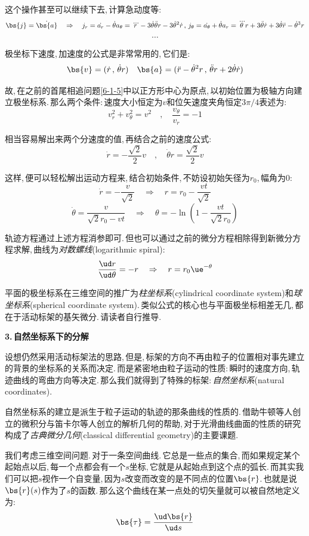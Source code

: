 这个操作甚至可以继续下去,\,计算急动度等:
\[\bs{j}=\dot{\bs{a}}\quad \Rightarrow \quad j_r=\dot{a_r}-\dot{\theta}a_\theta=\dddot{r}-3\dot{\theta}\ddot{\theta}r-3\dot{\theta}^2\dot{r}\,,\,j_\theta=\dot{a_\theta}+\dot{\theta}a_r=\dddot{\theta}r+3\ddot{\theta}\dot{r}+3\dot{\theta}\ddot{r}-\dot{\theta}^3r\]
\[\cdots\]

极坐标下速度,\,加速度的公式是非常常用的,\,它们是:
\[\bs{v}=(\dot{r}\,,\,\dot{\theta}r)\quad\bs{a}=(\ddot{r}-\dot{\theta}^2r\,,\,\ddot{\theta}r+2\dot{\theta}\dot{r})\]

故,\,在之前的首尾相追问题\ref{6-1-5}中以正方形中心为原点,\,以初始位置为极轴方向建立极坐标系.\,那么两个条件:\,速度大小恒定为$v$和位矢速度夹角恒定$3\pi/4$表述为:
\[v_r^2+v_\theta^2=v^2\quad ,\quad \frac{v_\theta}{v_r}=-1\]

相当容易解出来两个分速度的值,\,再结合之前的速度公式:
\[\dot{r}=-\frac{\sqrt{2}}{2}v\quad ,\quad \dot{\theta}r=\frac{\sqrt{2}}{2}v\]

这样,\,便可以轻松解出运动方程来,\,结合初始条件,\,不妨设初始矢径为$r_0$,\,幅角为$0$:
\[\dot{r}=-\frac{v}{\sqrt{2}}\quad \Rightarrow \quad r=r_0-\frac{vt}{\sqrt{2}}\]
\[\dot{\theta}=\frac{v}{\sqrt{2}r_0-vt}\quad \Rightarrow \quad  \theta =-\ln\left(1-\frac{vt}{\sqrt{2}r_0}\right)\]

轨迹方程通过上述方程消参即可.\,但也可以通过之前的微分方程相除得到新微分方程求解,\,曲线为\emph{对数螺线}(logarithmic spiral):
\[\frac{\ud r}{\ud \theta}=-r\quad \Rightarrow \quad r=r_0\ue^{-\theta}\]

平面的极坐标系在三维空间的推广为\emph{柱坐标系}(cylindrical coordinate system)和\emph{球坐标系}(spherical coordinate system).\,类似公式的核心也与平面极坐标相差无几,\,都在于活动标架的基矢微分.\,请读者自行推导.

\vspace{0.2cm}
{\bf 3.\,自然坐标系下的分解}

设想仍然采用活动标架法的思路,\,但是,\,标架的方向不再由粒子的位置相对事先建立的背景的坐标系的关系而决定.\,而是紧密地由粒子运动的性质:\,瞬时的速度方向,\,轨迹曲线的弯曲方向等决定.\,那么我们就得到了特殊的标架:\,\emph{自然坐标系}(natural coordinates).

自然坐标系的建立是派生于粒子运动的轨迹的那条曲线的性质的.\,借助牛顿等人创立的微积分与笛卡尔等人创立的解析几何的帮助,\,对于光滑曲线曲面的性质的研究构成了\emph{古典微分几何}(classical differential geometry)的主要课题.\,

我们考虑三维空间问题.\,对于一条空间曲线.\,它总是一些点的集合,\,而如果规定某个起始点以后,\,每一个点都会有一个$s$坐标,\,它就是从起始点到这个点的弧长.\,而其实我们可以把$s$视作一个自变量,\,因为$s$改变而改变的是不同点的位置$\bs{r}$.\,也就是说$\bs{r}(s)$作为了$s$的函数.\,那么这个曲线在某一点处的切矢量就可以被自然地定义为:
\[\bs{\tau}=\frac{\ud \bs{r}}{\ud s}\]

